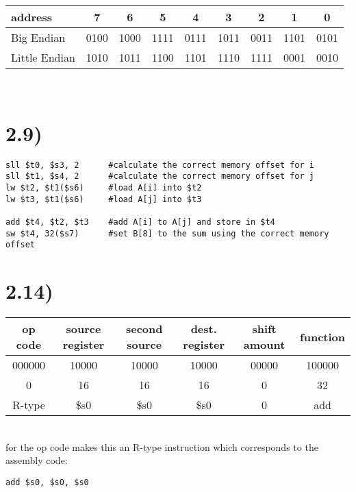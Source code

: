 \documentclass[a4paper,11pt]{article}
\begin{document}
\noindent \begin{tabular}{| l | c | c | c | c | c | c | c | c |}
  \hline
  address & 7 & 6 & 5 & 4 & 3 & 2 & 1 & 0 \\ \hline	
  Big Endian  & 0100 & 1000 & 1111 & 0111 & 1011 & 0011 & 1101 & 0101 \\  \hline  		
  Little Endian & 1010 & 1011 & 1100 & 1101 & 1110 & 1111 & 0001 & 0010 \\ \hline
\end{tabular} \\


\section*{2.9)} 

\begin{verbatim}
sll $t0, $s3, 2      #calculate the correct memory offset for i
sll $t1, $s4, 2      #calculate the correct memory offset for j
lw $t2, $t1($s6)     #load A[i] into $t2
lw $t3, $t1($s6)     #load A[j] into $t3

add $t4, $t2, $t3    #add A[i] to A[j] and store in $t4
sw $t4, 32($s7)      #set B[8] to the sum using the correct memory offset
\end{verbatim}


\section*{2.14)} 

\begin{tabular}{| c | c | c | c | c | c |}
  \hline	
  op code & source register & second source & dest. register & shift amount & function \\  \hline  		
  000000 & 10000 & 10000 & 10000 & 00000 & 100000  \\ \hline
  0 & 16 & 16 & 16 & 0 & 32 \\ \hline
  R-type & \$s0 & \$s0 & \$s0 & 0 & add \\\hline
\end{tabular} \\

 for the op code makes this an R-type instruction which corresponds to the assembly code:
\begin{verbatim}
add $s0, $s0, $s0
\end{verbatim}
\end{document}
